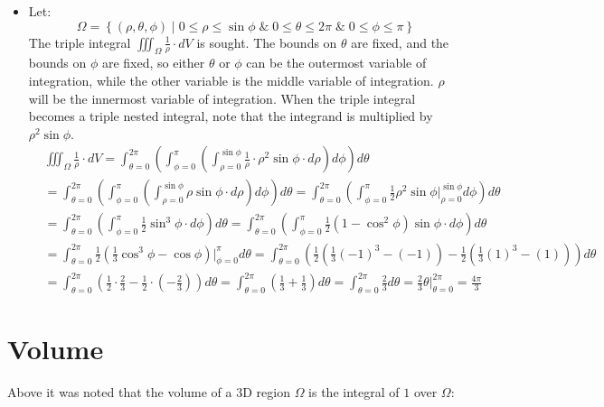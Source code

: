 \documentclass{article}
\begin{document}
\begin{itemize}
\item Let: 
\[\Omega = \left\{(\rho,\theta,\phi) \middle| 0 \leq \rho \leq \sin\phi \;\&\; 0 \leq \theta \leq 2\pi \;\&\; 0 \leq \phi \leq \pi \right\}\]
The triple integral \(\iiint_{\Omega} \frac{1}{\rho} \cdot dV\) is sought. The bounds on \(\theta\) are fixed, and the bounds on \(\phi\) are fixed, so either \(\theta\) or \(\phi\) can be the outermost variable of integration, while the other variable is the middle variable of integration. \(\rho\) will be the innermost variable of integration. When the triple integral becomes a triple nested integral, note that the integrand is multiplied by \(\rho^2 \sin\phi\). 
\begin{align*}
& \iiint_{\Omega} \frac{1}{\rho} \cdot dV  
= \int_{\theta = 0}^{2\pi} \left(\int_{\phi = 0}^{\pi} \left(\int_{\rho = 0}^{\sin\phi} \frac{1}{\rho} \cdot \rho^2 \sin\phi \cdot d\rho \right)d\phi \right)d\theta \\ 
& = \int_{\theta = 0}^{2\pi} \left(\int_{\phi = 0}^{\pi} \left(\int_{\rho = 0}^{\sin\phi} \rho \sin\phi \cdot d\rho \right)d\phi \right)d\theta 
= \int_{\theta = 0}^{2\pi} \left(\int_{\phi = 0}^{\pi} \frac{1}{2}\rho^2 \sin\phi \Big|_{\rho = 0}^{\sin\phi} d\phi \right)d\theta \\ 
& = \int_{\theta = 0}^{2\pi} \left(\int_{\phi = 0}^{\pi} \frac{1}{2}\sin^3 \phi \cdot d\phi \right)d\theta  
= \int_{\theta = 0}^{2\pi} \left(\int_{\phi = 0}^{\pi} \frac{1}{2}(1 - \cos^2\phi)\sin\phi \cdot d\phi \right)d\theta \\  
& = \int_{\theta = 0}^{2\pi} \frac{1}{2}(\frac{1}{3}\cos^3\phi - \cos\phi)\Big|_{\phi = 0}^{\pi} d\theta  
= \int_{\theta = 0}^{2\pi} (\frac{1}{2}(\frac{1}{3}(-1)^3 - (-1)) - \frac{1}{2}(\frac{1}{3}(1)^3 - (1)))d\theta \\ 
& = \int_{\theta = 0}^{2\pi} (\frac{1}{2} \cdot \frac{2}{3} - \frac{1}{2} \cdot (-\frac{2}{3}))d\theta 
= \int_{\theta = 0}^{2\pi} (\frac{1}{3} + \frac{1}{3})d\theta   
= \int_{\theta = 0}^{2\pi} \frac{2}{3} d\theta 
= \frac{2}{3}\theta\Big|_{\theta = 0}^{2\pi} 
= \frac{4\pi}{3}
\end{align*}
\end{itemize}




\section*{Volume}

Above it was noted that the volume of a 3D region \(\Omega\) is the integral of \(1\) over \(\Omega\): 
\end{document}
